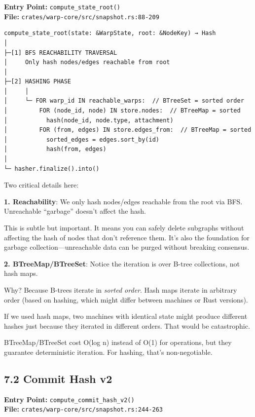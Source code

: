 \documentclass[11pt]{book}
\newenvironment{directors}
{\begin{mdframed}[
  linecolor=blue!60,
  linewidth=2pt,
  leftline=true,
  rightline=false,
  topline=false,
  bottomline=false,
  backgroundcolor=blue!3,
  innerleftmargin=12pt,
  innerrightmargin=10pt,
  innertopmargin=8pt,
  innerbottommargin=8pt,
  skipabove=12pt,
  skipbelow=12pt
]\small\sffamily\color{blue!70!black}}
{\end{mdframed}}
\begin{document}
\textbf{Entry Point:} \texttt{compute\_state\_root()} \\
\textbf{File:} \texttt{crates/warp-core/src/snapshot.rs:88-209}

\begin{verbatim}
compute_state_root(state: &WarpState, root: &NodeKey) → Hash
│
├─[1] BFS REACHABILITY TRAVERSAL
│     Only hash nodes/edges reachable from root
│
├─[2] HASHING PHASE
│     │
│     └─ FOR warp_id IN reachable_warps:  // BTreeSet = sorted order
│         FOR (node_id, node) IN store.nodes:  // BTreeMap = sorted
│           hash(node_id, node.type, attachment)
│         FOR (from, edges) IN store.edges_from:  // BTreeMap = sorted
│           sorted_edges = edges.sort_by(id)
│           hash(from, edges)
│
└─ hasher.finalize().into()
\end{verbatim}

\begin{directors}
Two critical details here:

\textbf{1. Reachability}: We only hash nodes/edges reachable from the root via BFS. Unreachable ``garbage'' doesn't affect the hash.

This is subtle but important. It means you can safely delete subgraphs without affecting the hash of nodes that don't reference them. It's also the foundation for garbage collection---unreachable data can be purged without breaking consensus.

\textbf{2. BTreeMap/BTreeSet}: Notice the iteration is over B-tree collections, not hash maps.

Why? Because B-trees iterate in \emph{sorted order}. Hash maps iterate in arbitrary order (based on hashing, which might differ between machines or Rust versions).

If we used hash maps, two machines with identical state might produce different hashes just because they iterated in different orders. That would be catastrophic.

BTreeMap/BTreeSet cost O(log n) instead of O(1) for operations, but they guarantee deterministic iteration. For hashing, that's non-negotiable.
\end{directors}

\subsection{7.2 Commit Hash v2}

\textbf{Entry Point:} \texttt{compute\_commit\_hash\_v2()} \\
\textbf{File:} \texttt{crates/warp-core/src/snapshot.rs:244-263}
\end{document}
